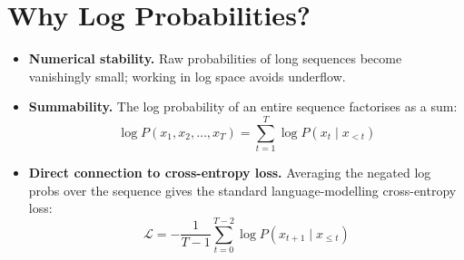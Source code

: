 \documentclass[10pt]{article}
\begin{document}
\section{Why Log Probabilities?}

\begin{itemize}
  \item \textbf{Numerical stability.} Raw probabilities of long sequences
        become vanishingly small; working in log space avoids underflow.

  \item \textbf{Summability.} The log probability of an entire sequence
        factorises as a sum:
        \[
          \log P(x_1, x_2, \ldots, x_T) = \sum_{t=1}^{T} \log P(x_t \mid x_{<t})
        \]

  \item \textbf{Direct connection to cross-entropy loss.}
        Averaging the negated log probs over the sequence gives the
        standard language-modelling cross-entropy loss:
        \[
          \mathcal{L} = -\frac{1}{T-1} \sum_{t=0}^{T-2}
          \log P(x_{t+1} \mid x_{\leq t})
        \]
\end{itemize}
\end{document}
